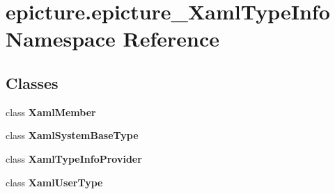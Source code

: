\hypertarget{namespaceepicture_1_1epicture___xaml_type_info}{}\section{epicture.\+epicture\+\_\+\+Xaml\+Type\+Info Namespace Reference}
\label{namespaceepicture_1_1epicture___xaml_type_info}
\subsection*{Classes}
\begin{DoxyCompactItemize}
\item 
class {\bfseries Xaml\+Member}
\item 
class {\bfseries Xaml\+System\+Base\+Type}
\item 
class {\bfseries Xaml\+Type\+Info\+Provider}
\item 
class {\bfseries Xaml\+User\+Type}
\end{DoxyCompactItemize}

